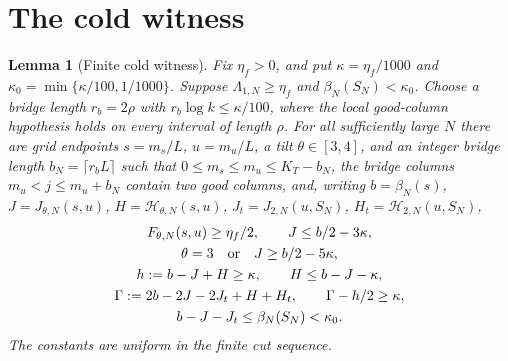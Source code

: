 \documentclass[11pt]{article}
\numberwithin{equation}{section}
\newtheorem{lemma}[lemma]{Lemma}
\newcommand{\1}{\mathbf 1}
\begin{document}
\section{The cold witness}

\begin{lemma}[Finite cold witness]\label{lem:cold-witness}
Fix $\eta_f>0$, and put $\kappa=\eta_f/1000$ and
$\kappa_0=\min\{\kappa/100,1/1000\}$.
Suppose $\Lambda_{1,N}\ge\eta_f$ and
$\beta_N(S_N)<\kappa_0$.
Choose a bridge length $r_b=2\rho$ with
$r_b\log k\le\kappa/100$, where the local good-column hypothesis holds
on every interval of length $\rho$.  For all sufficiently large $N$ there
are grid endpoints $s=m_s/L$, $u=m_u/L$, a tilt $\theta\in[3,4]$, and an
integer bridge length $b_N=\lceil r_bL\rceil$ such that
$0\le m_s\le m_u\le K_T-b_N$, the bridge columns
$m_u<j\le m_u+b_N$ contain two good columns, and, writing
$b=\beta_N(s)$, $J=J_{\theta,N}(s,u)$,
$H=\mathcal H_{\theta,N}(s,u)$, $J_t=J_{2,N}(u,S_N)$,
$H_t=\mathcal H_{2,N}(u,S_N)$,
\begin{gather}
 F_{\theta,N}(s,u)\ge\eta_f/2,\qquad
 J\le b/2-3\kappa,\label{eq:repair-witness-upper}\\
 \theta=3\quad\hbox{or}\quad J\ge b/2-5\kappa,
 \label{eq:repair-witness-lower}\\
 h:=b-J+H\ge\kappa,\qquad H\le b-J-\kappa,
 \label{eq:repair-witness-geometry}\\
 \Gamma:=2b-2J-2J_t+H+H_t,\qquad
 \Gamma-h/2\ge\kappa,\label{eq:repair-witness-collision}\\
 b-J-J_t\le\beta_N(S_N)<\kappa_0.
 \label{eq:repair-witness-mean}
\end{gather}
The constants are uniform in the finite cut sequence.
\end{lemma}
\end{document}
